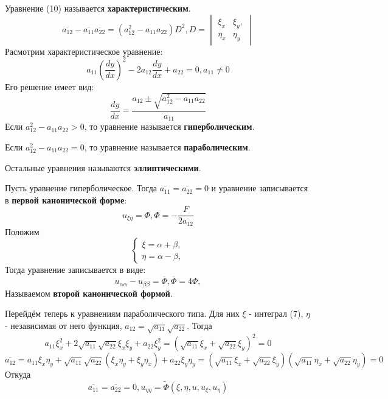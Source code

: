 \documentclass[11pt]{article}
\begin{document}
Уравнение (10) называется \textbf{характеристическим}.
\begin{equation*}
\overline{a_{12}} - \overline{a_{11}}\overline{a_{22}} = (a_{12}^2 - a_{11}a_{22})D^2,
D = \begin{vmatrix}
\xi_x   & \xi_y, \\
\eta_x  & \eta_y               
\end{vmatrix}
\end{equation*}
Расмотрим характеристическое уравнение:
\begin{equation*}
a_{11}\left(\frac{dy}{dx}\right)^2 - 2a_{12}\frac{dy}{dx} + a_{22} = 0, a_{11} \neq 0
\end{equation*}
Его решение имеет вид:
\begin{equation*}
\frac{dy}{dx} = \frac{a_{12} \pm \sqrt{a_{12}^2 - a_{11}a_{22}}}{a_{11}}
\end{equation*}
Если \(a_{12}^2 - a_{11}a_{22} > 0\), то уравнение называется \textbf{гиперболическим}.

Если \(a_{12}^2 - a_{11}a_{22} = 0\), то уравнение называется \textbf{параболическим}.

Остальные уравнения называются \textbf{эллиптическими}.

Пусть уравнение гиперболическое. Тогда \(\overline{a_{11}} = \overline{a_{22}} = 0\) и уравнение
записывается в \textbf{первой канонической форме}:
\begin{equation}
u_{\xi\eta} = \Phi, \Phi = -\frac{F}{2\overline{a_{12}}}
\end{equation}
Положим
\begin{equation}
\begin{cases}
\xi = \alpha + \beta, \\
\eta = \alpha - \beta,
\end{cases}
\end{equation}
Тогда уравнение записывается в виде:
\begin{equation}
u_{\alpha\alpha} - u_{\beta\beta} = \overline\Phi, \overline\Phi = 4\Phi,
\end{equation}
Называемом \textbf{второй канонической формой}.

Перейдём теперь к уравнениям параболического типа. Для них \(\xi\) - интеграл (7), \(\eta\) -
независимая от него функция, \(a_12 = \sqrt{a_{11}}\sqrt{a_{22}}\). Тогда
\begin{equation*}
a_{11}\xi_x^2 + 2\sqrt{a_{11}}\sqrt{a_{22}}\xi_x\xi_y + a_{22}\xi_y^2 =
(\sqrt{a_{11}}\xi_x + \sqrt{a_{22}}\xi_y)^2 = 0
\end{equation*}
\begin{equation*}
\overline{a_{12}} = a_{11}\xi_x\eta_y + \sqrt{a_{11}}\sqrt{a_{22}}(\xi_x\eta_y + \xi_y\eta_x)
+ a_{22}\xi_y\eta_y = (\sqrt{a_{11}}\xi_x + \sqrt{a_{22}}\xi_y)(\sqrt{a_{11}}\eta_x + \sqrt{a_{22}}\eta_y) = 0
\end{equation*}
Откуда
\begin{equation}
\overline{a_{11}} = \overline{a_{22}} = 0, u_{\eta\eta} = \tilde{\Phi}(\xi, \eta, u, u_\xi, u_\eta)
\end{equation}
\end{document}
